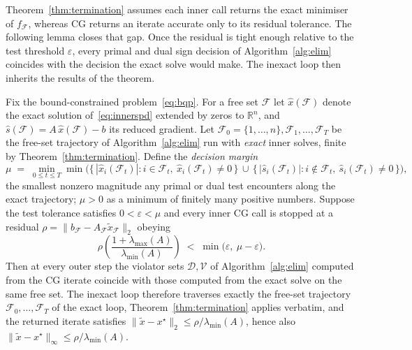 Theorem~\ref{thm:termination} assumes each inner call returns the exact minimiser of
$f_{\mathcal{F}}$, whereas CG returns an iterate accurate only to its residual tolerance. The
following lemma closes that gap. Once the residual is tight enough relative to the test
threshold $\varepsilon$, every primal and dual sign decision of Algorithm~\ref{alg:elim}
coincides with the decision the exact solve would make. The inexact loop then inherits the results of the
theorem.

\begin{lemma}\label{lem:inexact}
Fix the bound-constrained problem~\eqref{eq:bqp}. For a free set $\mathcal{F}$ let
$\hat x(\mathcal{F})$ denote the exact solution of~\eqref{eq:innerspd} extended by zeros to
$\mathbb{R}^n$, and $\hat s(\mathcal{F}) = A\,\hat x(\mathcal{F}) - b$ its reduced gradient.
Let $\mathcal{F}_0 = \{1,\dots,n\}, \mathcal{F}_1, \dots, \mathcal{F}_T$ be the free-set
trajectory of Algorithm~\ref{alg:elim} run with \emph{exact} inner solves, finite by
Theorem~\ref{thm:termination}. Define the \emph{decision margin}
\[
  \mu \;=\; \min_{0 \le t \le T} \min\Big(
    \big\{\, |\hat x_i(\mathcal{F}_t)| : i \in \mathcal{F}_t,\ \hat x_i(\mathcal{F}_t) \neq 0 \,\big\}
    \,\cup\,
    \big\{\, |\hat s_i(\mathcal{F}_t)| : i \notin \mathcal{F}_t,\ \hat s_i(\mathcal{F}_t) \neq 0 \,\big\}
  \Big),
\]
the smallest nonzero magnitude any primal or dual test encounters along the exact
trajectory; $\mu > 0$ as a minimum of finitely many positive numbers. Suppose the test
tolerance satisfies $0 < \varepsilon < \mu$ and every inner CG call is stopped at a residual
$\rho = \lVert b_{\mathcal{F}} - A_{\mathcal{F}}\tilde x_{\mathcal{F}} \rVert_2$ obeying
\begin{equation}\label{eq:inexactcond}
  \rho
  \left(\frac{1 + \lambda_{\max}(A)}{\lambda_{\min}(A)}\right)
  \;<\; \min\big(\varepsilon,\ \mu - \varepsilon\big).
\end{equation}
Then at every outer step the violator sets $\mathcal{D}, \mathcal{V}$ of
Algorithm~\ref{alg:elim} computed from the CG iterate coincide with those computed from the
exact solve on the same free set. The inexact loop therefore traverses exactly the free-set
trajectory $\mathcal{F}_0,\dots,\mathcal{F}_T$ of the exact loop, Theorem~\ref{thm:termination}
applies verbatim, and the returned iterate satisfies
$\lVert \tilde x - x^\star \rVert_2 \le \rho/\lambda_{\min}(A)$, hence also
$\lVert \tilde x - x^\star \rVert_\infty \le \rho/\lambda_{\min}(A)$.
\end{lemma}

